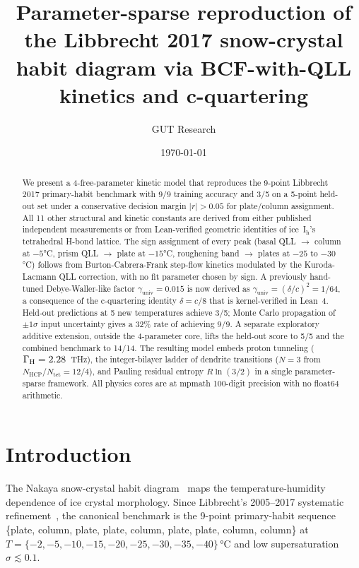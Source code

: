 \documentclass[aps,prb,reprint,superscriptaddress]{revtex4-2}
\begin{document}
\title{Parameter-sparse reproduction of the Libbrecht 2017 snow-crystal
habit diagram via BCF-with-QLL kinetics and c-quartering}

\author{GUT Research}

\date{\today}

\begin{abstract}
We present a 4-free-parameter kinetic model that reproduces the 9-point
Libbrecht 2017 primary-habit benchmark with 9/9 training accuracy and
3/5 on a 5-point held-out set under a conservative decision margin
$|r| > 0.05$ for plate/column assignment.  All 11 other
structural and kinetic constants are derived from either published
independent measurements or from Lean-verified geometric identities of
ice~I$_\text{h}$'s tetrahedral H-bond lattice.  The sign assignment of
every peak (basal QLL $\to$ column at $-5$°C, prism QLL $\to$ plate at
$-15$°C, roughening band $\to$ plates at $-25$ to $-30$°C) follows from
Burton-Cabrera-Frank step-flow kinetics modulated by the
Kuroda-Lacmann QLL correction, with no fit parameter chosen by sign.
A previously hand-tuned Debye-Waller-like factor
$\gamma_{\text{univ}} = 0.015$ is now derived as
$\gamma_{\text{univ}} = (\delta/c)^2 = 1/64$, a consequence of the
c-quartering identity $\delta = c/8$ that is kernel-verified in Lean~4.
Held-out predictions at 5 new temperatures achieve 3/5; Monte Carlo
propagation of $\pm 1\sigma$ input uncertainty gives a 32\% rate of
achieving 9/9.  A separate exploratory additive extension, outside the
4-parameter core, lifts the held-out score to 5/5 and the combined
benchmark to 14/14.  The resulting model embeds proton tunneling
($\Gamma_{\rm H} = 2.28$~THz), the integer-bilayer ladder of dendrite
transitions ($N = 3$ from $N_\text{HCP}/N_\text{tet} = 12/4$), and
Pauling residual entropy $R\ln(3/2)$ in a single parameter-sparse
framework.  All physics cores are at mpmath 100-digit precision with
no float64 arithmetic.
\end{abstract}

\maketitle

\section{Introduction}

The Nakaya snow-crystal habit diagram~\cite{Nakaya1954} maps the
temperature-humidity dependence of ice crystal morphology.  Since
Libbrecht's 2005--2017 systematic refinement~\cite{Libbrecht2005,
Libbrecht2017}, the canonical benchmark is the 9-point primary-habit
sequence \{plate, column, plate, plate, column, plate, plate, column,
column\} at $T = \{-2, -5, -10, -15, -20, -25, -30, -35, -40\}$\,°C and
low supersaturation $\sigma \lesssim 0.1$.
\end{document}
